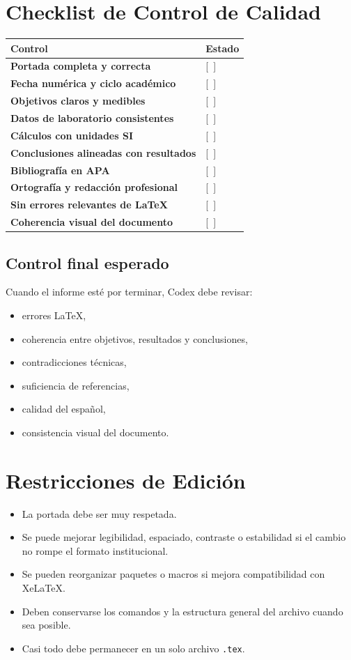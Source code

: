 \documentclass[12pt,a4paper]{article}
\begin{document}
\section{Checklist de Control de Calidad}
\begin{tabular}{>{\bfseries}p{8.5cm} p{4.5cm}}
\toprule
Control & Estado \\
\midrule
Portada completa y correcta & [\ ] \\
Fecha num\'erica y ciclo acad\'emico & [\ ] \\
Objetivos claros y medibles & [\ ] \\
Datos de laboratorio consistentes & [\ ] \\
C\'alculos con unidades SI & [\ ] \\
Conclusiones alineadas con resultados & [\ ] \\
Bibliograf\'ia en APA & [\ ] \\
Ortograf\'ia y redacci\'on profesional & [\ ] \\
Sin errores relevantes de LaTeX & [\ ] \\
Coherencia visual del documento & [\ ] \\
\bottomrule
\end{tabular}

\subsection{Control final esperado}
Cuando el informe est\'e por terminar, Codex debe revisar:
\begin{itemize}
  \item errores LaTeX,
  \item coherencia entre objetivos, resultados y conclusiones,
  \item contradicciones t\'ecnicas,
  \item suficiencia de referencias,
  \item calidad del espa\~nol,
  \item consistencia visual del documento.
\end{itemize}

\section{Restricciones de Edici\'on}
\begin{itemize}
  \item La portada debe ser muy respetada.
  \item Se puede mejorar legibilidad, espaciado, contraste o estabilidad si el cambio no rompe el formato institucional.
  \item Se pueden reorganizar paquetes o macros si mejora compatibilidad con XeLaTeX.
  \item Deben conservarse los comandos y la estructura general del archivo cuando sea posible.
  \item Casi todo debe permanecer en un solo archivo \texttt{.tex}.
\end{itemize}
\end{document}
